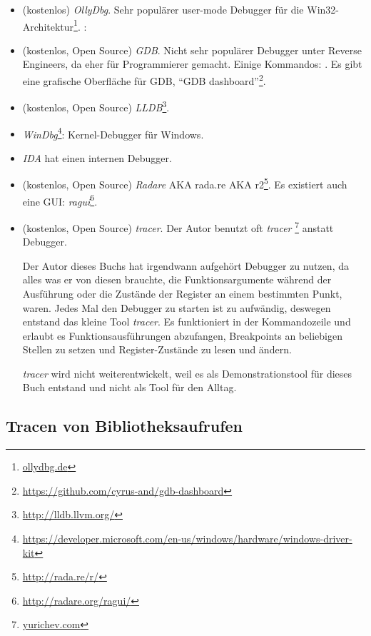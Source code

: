 \begin{itemize}
\item (kostenlos) \emph{OllyDbg}.
Sehr populärer user-mode Debugger für die Win32-Architektur\footnote{\href{http://www.ollydbg.de/}{ollydbg.de}}.
\ShortHotKeyCheatsheet: 

\item (kostenlos, Open Source) \emph{GDB}.
Nicht sehr populärer Debugger unter Reverse Engineers, da eher für Programmierer gemacht.
Einige Kommandos: .
Es gibt eine grafische Oberfläche für GDB, ``GDB dashboard''\footnote{\url{https://github.com/cyrus-and/gdb-dashboard}}.

\item (kostenlos, Open Source) \emph{LLDB}\footnote{\url{http://lldb.llvm.org/}}.

\item \emph{WinDbg}\footnote{\url{https://developer.microsoft.com/en-us/windows/hardware/windows-driver-kit}}:
Kernel-Debugger für Windows.

\item \emph{IDA} hat einen internen Debugger.

\item (kostenlos, Open Source) \emph{Radare} \ac{AKA} rada.re \ac{AKA} r2\footnote{\url{http://rada.re/r/}}.
Es existiert auch eine GUI: \emph{ragui}\footnote{\url{http://radare.org/ragui/}}.

\item (kostenlos, Open Source) \emph{tracer}.
\label{tracer}
Der Autor benutzt oft \emph{tracer}
\footnote{\href{http://yurichev.com/tracer-en.html}{yurichev.com}}
anstatt Debugger.

Der Autor dieses Buchs hat irgendwann aufgehört Debugger zu nutzen, da alles was er von diesen
brauchte, die Funktionsargumente während der Ausführung oder die Zustände der Register an einem
bestimmten Punkt, waren.
Jedes Mal den Debugger zu starten ist zu aufwändig, deswegen entstand das kleine Tool \emph{tracer}.
Es funktioniert in der Kommandozeile und erlaubt es Funktionsausführungen abzufangen,
Breakpoints an beliebigen Stellen zu setzen und Register-Zustände zu lesen und ändern.

\emph{tracer} wird nicht weiterentwickelt, weil es als Demonstrationstool für dieses Buch entstand
und nicht als Tool für den Alltag.
\end{itemize}

\subsection{Tracen von Bibliotheksaufrufen}

